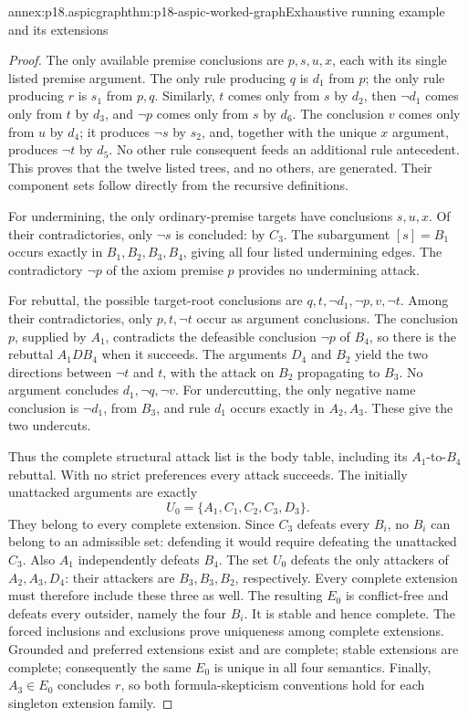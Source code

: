 \begin{annexitem}{annex:p18.aspicgraph}{thm:p18-aspic-worked-graph}{Exhaustive running example and its extensions}
\begin{proof}
The only available premise conclusions are \(p,s,u,x\), each with its
single listed premise argument. The only rule producing \(q\) is \(d_1\)
from \(p\); the only rule producing \(r\) is \(s_1\) from \(p,q\).
Similarly, \(t\) comes only from \(s\) by \(d_2\), then \(\neg d_1\)
comes only from \(t\) by \(d_3\), and \(\neg p\) comes only from \(s\)
by \(d_6\). The conclusion \(v\) comes only from \(u\) by \(d_4\);
it produces \(\neg s\) by \(s_2\), and, together with the unique \(x\)
argument, produces \(\neg t\) by \(d_5\).
No other rule consequent feeds an additional rule antecedent.
This proves that the twelve listed trees, and no others, are generated.
Their component sets follow directly from the recursive definitions.

For undermining, the only ordinary-premise targets have conclusions
\(s,u,x\). Of their contradictories, only \(\neg s\) is concluded:
by \(C_3\). The subargument \([s]=B_1\) occurs exactly in
\(B_1,B_2,B_3,B_4\), giving all four listed undermining edges.
The contradictory \(\neg p\) of the axiom premise \(p\) provides no
undermining attack.

For rebuttal, the possible target-root conclusions are
\(q,t,\neg d_1,\neg p,v,\neg t\).
Among their contradictories, only \(p,t,\neg t\) occur as argument
conclusions. The conclusion \(p\), supplied by \(A_1\), contradicts
the defeasible conclusion \(\neg p\) of \(B_4\), so there is
the rebuttal \(A_1 D B_4\) when it succeeds.
The arguments \(D_4\) and \(B_2\) yield the two directions between
\(\neg t\) and \(t\), with the attack on \(B_2\) propagating to
\(B_3\). No argument concludes \(d_1,\neg q,\neg v\).
For undercutting, the only negative name conclusion is
\(\neg d_1\), from \(B_3\), and rule \(d_1\) occurs exactly in
\(A_2,A_3\). These give the two undercuts.

Thus the complete structural attack list is the body table, including its
\(A_1\)-to-\(B_4\) rebuttal. With no strict preferences every attack
succeeds. The initially unattacked arguments are exactly
\[
 U_0=\{A_1,C_1,C_2,C_3,D_3\}.
\]
They belong to every complete extension. Since \(C_3\) defeats every
\(B_i\), no \(B_i\) can belong to an admissible set: defending it would
require defeating the unattacked \(C_3\). Also \(A_1\) independently
defeats \(B_4\).
The set \(U_0\) defeats the only attackers of \(A_2,A_3,D_4\):
their attackers are \(B_3,B_3,B_2\), respectively.
Every complete extension must therefore include these three as well.
The resulting \(E_0\) is conflict-free and defeats every outsider, namely
the four \(B_i\). It is stable and hence complete.
The forced inclusions and exclusions prove uniqueness among complete
extensions. Grounded and preferred extensions exist and are complete;
stable extensions are complete; consequently the same \(E_0\) is unique
in all four semantics. Finally, \(A_3\in E_0\) concludes \(r\), so both
formula-skepticism conventions hold for each singleton extension family.
\end{proof}
\end{annexitem}

